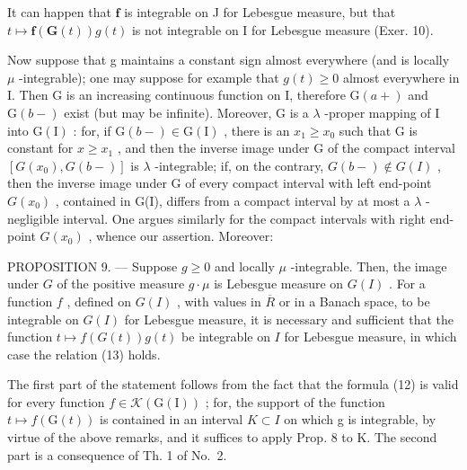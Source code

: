 It can happen that \(\mathbf{f}\) is integrable on J for Lebesgue measure, but that \(t \mapsto \mathbf{f}(\mathbf{G}(t))g(t)\) is not integrable on I for Lebesgue measure (Exer. 10).

Now suppose that g maintains a constant sign almost everywhere (and is locally \(\mu\) -integrable); one may suppose for example that \(g(t) \geqslant 0\) almost everywhere in I. Then G is an increasing continuous function on I, therefore \(\mathrm{G}(a+)\) and \(\mathrm{G}(b-)\) exist (but may be infinite). Moreover, G is a \(\lambda\) -proper mapping of I into \(\mathrm{G}(\mathrm{I})\) : for, if \(\mathrm{G}(b-) \in \mathrm{G}(\mathrm{I})\) , there is an \(x_{1} \geqslant x_{0}\) such that G is constant for \(x \geqslant x_{1}\) , and then the inverse image under G of the compact interval \([G(x_{0}), G(b-)]\) is \(\lambda\) -integrable; if, on the contrary, \(G(b-) \notin G(I)\) , then the inverse image under G of every compact interval with left end-point \(G(x_{0})\) , contained in G(I), differs from a compact interval by at most a \(\lambda\) -negligible interval. One argues similarly for the compact intervals with right end-point \(G(x_{0})\) , whence our assertion. Moreover:

PROPOSITION 9. --- Suppose \(g \geqslant 0\) and locally \(\mu\) -integrable. Then, the image under \(G\) of the positive measure \(g \cdot \mu\) is Lebesgue measure on \(G(I)\) . For a function \(f\) , defined on \(G(I)\) , with values in \(\overline{R}\) or in a Banach space, to be integrable on \(G(I)\) for Lebesgue measure, it is necessary and sufficient that the function \(t \mapsto f(G(t))g(t)\) be integrable on \(I\) for Lebesgue measure, in which case the relation (13) holds.

The first part of the statement follows from the fact that the formula (12) is valid for every function \(f \in \mathcal{K}(\mathrm{G}(\mathrm{I}))\) ; for, the support of the function \(t \mapsto f(\mathrm{G}(t))\) is contained in an interval \(K \subset I\) on which g is integrable, by virtue of the above remarks, and it suffices to apply Prop. 8 to K. The second part is a consequence of Th. 1 of No.~2.

